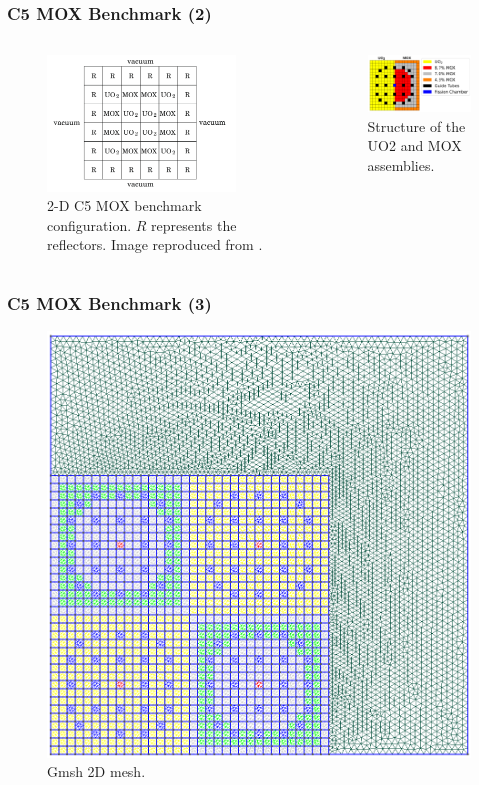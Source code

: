 \begin{frame}
\frametitle{C5 MOX Benchmark (2)}

\begin{columns}
    \column[t]{5cm}
    \begin{figure}[htbp!]
        \begin{center}
            \includegraphics[width=5cm]{figures/bench-config}
        \end{center}
        \caption{2-D C5 MOX benchmark configuration. $R$ represents the reflectors. Image reproduced from \cite{capilla_applications_2009}.}
    \end{figure}

    \column[t]{6cm}
    \begin{figure}[htbp!]
        \begin{center}
            \includegraphics[width=6cm]{figures/bench-config2B}
        \end{center}
        \caption{Structure of the UO2 and MOX assemblies.}
    \end{figure}
\end{columns}
\end{frame}


\begin{frame}
\frametitle{C5 MOX Benchmark (3)}

    \begin{figure}[htbp!]
        \begin{center}
            \includegraphics[width=6.cm]{figures/bench-mesh}
        \end{center}
        \caption{Gmsh 2D mesh.}
    \end{figure}

\end{frame}

